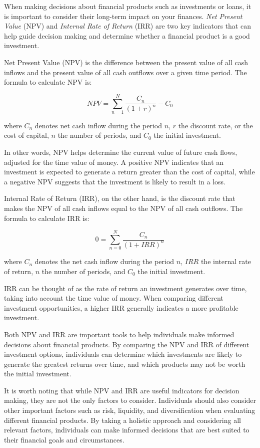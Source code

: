 \documentclass[
  12pt,
  oneside]{book}
\theoremstyle{definition}
\theoremstyle{definition}
\theoremstyle{definition}
\theoremstyle{definition}
\theoremstyle{remark}
\begin{document}
When making decisions about financial products such as investments or loans, it is important to consider their long-term impact on your finances. \emph{Net Present Value} (NPV) and \emph{Internal Rate of Return} (IRR) are two key indicators that can help guide decision making and determine whether a financial product is a good investment.

Net Present Value (NPV) is the difference between the present value of all cash inflows and the present value of all cash outflows over a given time period. The formula to calculate NPV is:

\[ NPV = \sum_{n=1}^{N} \frac{C_n}{(1+r)^n} - C_0 \]

where \(C_n\) denotes net cash inflow during the period \(n\), \(r\) the discount rate, or the cost of capital, \(n\) the number of periods, and \(C_0\) the initial investment.

In other words, NPV helps determine the current value of future cash flows, adjusted for the time value of money. A positive NPV indicates that an investment is expected to generate a return greater than the cost of capital, while a negative NPV suggests that the investment is likely to result in a loss.

Internal Rate of Return (IRR), on the other hand, is the discount rate that makes the NPV of all cash inflows equal to the NPV of all cash outflows. The formula to calculate IRR is:

\[ 0 = \sum_{n=0}^{N} \frac{C_n}{(1+IRR)^n}  \]

where \(C_n\) denotes the net cash inflow during the period \(n\), \(IRR\) the internal rate of return, \(n\) the number of periods, and \(C_0\) the initial investment.

IRR can be thought of as the rate of return an investment generates over time, taking into account the time value of money. When comparing different investment opportunities, a higher IRR generally indicates a more profitable investment.

Both NPV and IRR are important tools to help individuals make informed decisions about financial products. By comparing the NPV and IRR of different investment options, individuals can determine which investments are likely to generate the greatest returns over time, and which products may not be worth the initial investment.

It is worth noting that while NPV and IRR are useful indicators for decision making, they are not the only factors to consider. Individuals should also consider other important factors such as risk, liquidity, and diversification when evaluating different financial products. By taking a holistic approach and considering all relevant factors, individuals can make informed decisions that are best suited to their financial goals and circumstances.
\end{document}
